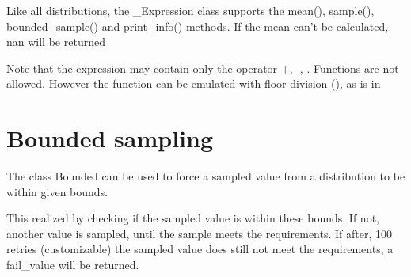 \documentclass[letterpaper,10pt,english]{sphinxmanual}
\begin{document}
Like all distributions, the \_Expression class supports the
mean(), sample(), bounded\_sample() and print\_info() methods.
If the mean can’t be calculated, nan will be returned

\begin{sphinxVerbatim}[commandchars=\\\{\}]
     
     
      
\end{sphinxVerbatim}

Note that the expression may contain only the operator +, -, .
Functions are not allowed. However the  function can be emulated with floor division (\sphinxcode{\textbackslash{}\textbackslash{}}), as is in

\begin{sphinxVerbatim}[commandchars=\\\{\}]
       
\end{sphinxVerbatim}


\section{Bounded sampling}
\label{\detokenize{Distributions:bounded-sampling}}
The class Bounded can be used to force a sampled value from a distribution to be within given bounds.

This realized by checking if the sampled value is within these bounds. If not, another value is sampled,
until the sample meets the requirements. If after, 100 retries (customizable) the sampled value does
still not meet the requirements, a fail\_value will be returned.
\end{document}
